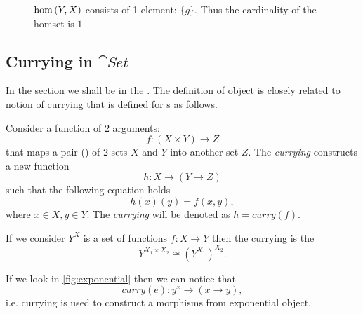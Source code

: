 \begin{remark}
\begin{figure}[H]
  \caption{$\catmset{Y}{X}$ consists of 1 element: $\{g\}$.
    Thus the cardinality of the homset is $1$}
  \label{fig:exponential_set_remark_y_x}
\end{figure}
\end{remark}

\subsection{Currying in $\cat{Set}$}
In the section we shall be in the . 
The definition of  object is closely
related to notion of currying that is defined for s
as follows. 
\begin{definition}[Currying]
\label{def:currying_set}
Consider a function of 2 arguments:
\[
f:(X\times Y) \to Z
\]
that maps a pair () of 2 sets $X$ and $Y$ into
another set $Z$.
The \textit{currying} constructs a new function
\[
h : X \to (Y \to Z)
\]
such that the following equation holds
\[
h(x)(y) = f(x,y), 
\]
where $x \in X, y \in Y$. The \textit{currying} will be denoted as 
$h = curry(f)$.
\end{definition}

\begin{remark}[Currying]
If we consider $Y^X$ is a set of functions $f : X \to Y$ then the
currying is the 
\[
Y^{X_1 \times X_2} \cong \left(Y^{X_1}\right)^{X_2}.
\] 
\end{remark}
\begin{remark}
If we look in \cref{fig:exponential} then we can notice that 
\[
curry(e): y^x \to (x \to y),
\]
i.e. currying is used to construct a morphisms from exponential
object. 
\end{remark}

